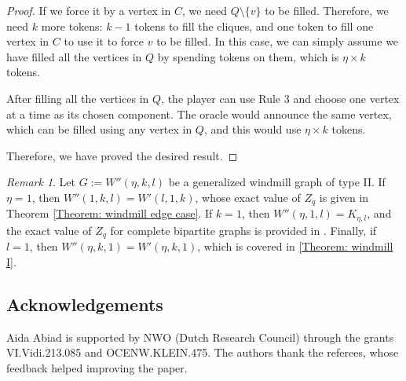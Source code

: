 \documentclass[11pt]{article}
\theoremstyle{plain}
\theoremstyle{definition}
\theoremstyle{remark}
\newtheorem*{remark}{Remark}
\begin{document}
\begin{proof}
    If we force it by a vertex in $C$, we need $Q \setminus \{v\}$ to be filled. Therefore, we need $k$ more tokens: $k-1$ tokens to fill the cliques, and one token to fill one vertex in $C$ to use it to force $v$ to be filled. In this case, we can simply assume we have filled all the vertices in $Q$ by spending tokens on them, which is $\eta \times k$ tokens.


    
    After filling all the vertices in $Q$, the player can use Rule 3 and choose one vertex at a time as its chosen component. The oracle would announce the same vertex, which can be filled using any vertex in $Q$, and this would use $\eta \times k$ tokens. 

    Therefore, we have proved the desired result.
\end{proof}


\begin{remark} \label{obs: edge case windmill}
    Let $G := W''(\eta, k, l)$ be a generalized windmill graph of type II. If $\eta = 1$, then $W''(1, k, l) = W'(l, 1, k)$, whose exact value of $Z_q$ is given in Theorem \ref{Theorem: windmill edge case}. If $k = 1$, then $W''(\eta, 1, l) = K_{\eta, l}$, and the exact value of $Z_q$ for complete bipartite graphs is provided in \cite[Section~4.2]{fallat2024q}. Finally, if $l = 1$, then $W''(\eta, k, 1) = W'(\eta, k, 1)$, which is covered in \ref{Theorem: windmill I}.
\end{remark}

 
\subsection*{Acknowledgements}
Aida Abiad is supported by NWO (Dutch Research Council) through the grants \linebreak VI.Vidi.213.085 and OCENW.KLEIN.475. The authors thank the referees, whose feedback helped improving the paper.
\end{document}
